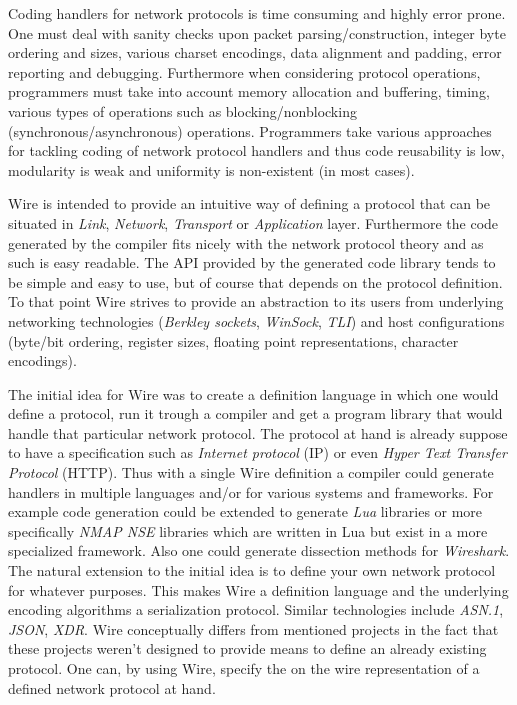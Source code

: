 \documentclass[times, utf8, diplomski]{fer}
\begin{document}
Coding handlers for network protocols is time consuming and highly error prone. 
One must deal with sanity checks upon packet parsing/construction, integer byte ordering and sizes, various charset encodings, data alignment and padding, error reporting and debugging. 
Furthermore when considering protocol operations, programmers must take into account memory allocation and buffering, timing, various types of operations such as blocking/nonblocking (synchronous/asynchronous) operations.
Programmers take various approaches for tackling coding of network protocol handlers and thus code reusability is low, modularity is weak and uniformity is non-existent (in most cases). 

Wire is intended to provide an intuitive way of defining a protocol that can be situated in \emph{Link}, \emph{Network}, \emph{Transport} or \emph{Application} layer. 
Furthermore the code generated by the compiler fits nicely with the network protocol theory and as such is easy readable. 
The API provided by the generated code library tends to be simple and easy to use, but of course that depends on the protocol definition. 
To that point Wire strives to provide an abstraction to its users from underlying networking technologies (\emph{Berkley sockets}, \emph{WinSock}, \emph{TLI}) and host configurations (byte/bit ordering, register sizes, floating point representations, character encodings).

The initial idea for Wire was to create a definition language in which one would define a protocol, run it trough a compiler and get a program library that would handle that particular network protocol. The protocol at hand is already suppose to have a specification such as \emph{Internet protocol} (IP) or even \emph{Hyper Text Transfer Protocol} (HTTP). 
Thus with a single Wire definition a compiler could generate handlers in multiple languages and/or for various systems and frameworks. 
For example code generation could be extended to generate \emph{Lua} libraries or more specifically \emph{NMAP NSE} libraries which are written in Lua but exist in a more specialized framework. 
Also one could generate dissection methods for \emph{Wireshark}.
The natural extension to the initial idea is to define your own network protocol for whatever purposes. 
This makes Wire a definition language and the underlying encoding algorithms a serialization protocol. 
Similar technologies include \emph{ASN.1}, \emph{JSON}, \emph{XDR}.
Wire conceptually differs from mentioned projects in the fact that these projects weren't designed to provide means to define an already existing protocol.
One can, by using Wire, specify the on the wire representation of a defined network protocol at hand.
\end{document}
